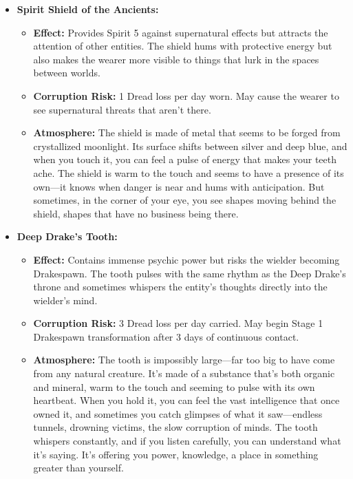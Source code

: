 \documentclass[11pt]{article}
\begin{document}
\begin{itemize}
\item \textbf{Spirit Shield of the Ancients:} 
  \begin{itemize}
  \item \textbf{Effect:} Provides Spirit 5 against supernatural effects but attracts the attention of other entities. The shield hums with protective energy but also makes the wearer more visible to things that lurk in the spaces between worlds.
  \item \textbf{Corruption Risk:} 1 Dread loss per day worn. May cause the wearer to see supernatural threats that aren't there.
  \item \textbf{Atmosphere:} The shield is made of metal that seems to be forged from crystallized moonlight. Its surface shifts between silver and deep blue, and when you touch it, you can feel a pulse of energy that makes your teeth ache. The shield is warm to the touch and seems to have a presence of its own—it knows when danger is near and hums with anticipation. But sometimes, in the corner of your eye, you see shapes moving behind the shield, shapes that have no business being there.
  \end{itemize}
\item \textbf{Deep Drake's Tooth:} 
  \begin{itemize}
  \item \textbf{Effect:} Contains immense psychic power but risks the wielder becoming Drakespawn. The tooth pulses with the same rhythm as the Deep Drake's throne and sometimes whispers the entity's thoughts directly into the wielder's mind.
  \item \textbf{Corruption Risk:} 3 Dread loss per day carried. May begin Stage 1 Drakespawn transformation after 3 days of continuous contact.
  \item \textbf{Atmosphere:} The tooth is impossibly large—far too big to have come from any natural creature. It's made of a substance that's both organic and mineral, warm to the touch and seeming to pulse with its own heartbeat. When you hold it, you can feel the vast intelligence that once owned it, and sometimes you catch glimpses of what it saw—endless tunnels, drowning victims, the slow corruption of minds. The tooth whispers constantly, and if you listen carefully, you can understand what it's saying. It's offering you power, knowledge, a place in something greater than yourself.
  \end{itemize}
\end{itemize}
\end{document}
